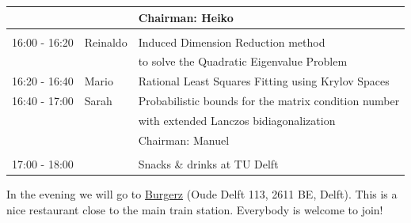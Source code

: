 \documentclass{article}
\begin{document}
\begin{table}[h]
\begin{tabular}{lll}
& & \hfill \small{Chairman: Heiko}  \\
\hline \\ [-1.5ex]
16:00 - 16:20 & Reinaldo & Induced Dimension Reduction method \\
            & & to solve the Quadratic Eigenvalue Problem \\ [0.5ex]
16:20 - 16:40 & Mario & Rational Least Squares Fitting using Krylov Spaces\\ [0.5ex]
16:40 - 17:00 & Sarah & Probabilistic bounds for the matrix condition number \\
                    & & with extended Lanczos bidiagonalization\\ [0.5ex]
& & \hfill \small{Chairman: Manuel}\\
\hline \\ [-1.5ex]
17:00 - 18:00 & & Snacks \& drinks at TU Delft
\end{tabular}
\end{table}
\bigskip
In the evening we will go to \href{http://www.burgerz.nl/en/contact/delft}{Burgerz} (Oude Delft 113, 2611 BE, Delft). This is a nice restaurant close to the main train station. Everybody is welcome to join!
\end{document}
